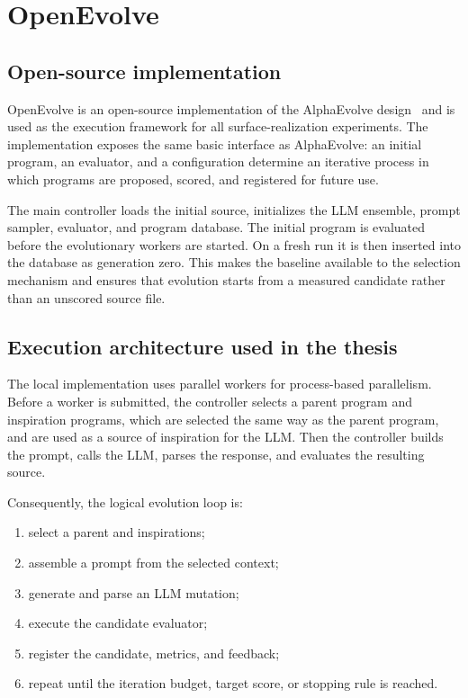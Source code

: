 \section{OpenEvolve}
\label{sec:openevolve}

\subsection{Open-source implementation}

OpenEvolve is an open-source implementation of the AlphaEvolve design~\cite{sharma2025openevolve}
and is used as the execution framework for all surface-realization experiments.
The implementation exposes the same basic interface as AlphaEvolve: an initial
program, an evaluator, and a configuration determine an iterative process in
which programs are proposed, scored, and registered for future use.

The main controller loads the
initial source, initializes the LLM ensemble, prompt sampler, evaluator, and
program database.
The initial program is evaluated before the evolutionary workers are started. On a
fresh run it is then inserted into the database as generation zero. This makes
the baseline available to the selection mechanism and ensures that evolution
starts from a measured candidate rather than an unscored source file.

\subsection{Execution architecture used in the thesis}

The local implementation uses parallel workers for
process-based parallelism. Before a worker is submitted, the controller selects
a parent program and inspiration programs, which are selected the same way as the parent
program, and are used as a source of inspiration for the LLM. Then the controller builds the prompt, calls the LLM,
parses the response, and evaluates the resulting source.

Consequently, the logical evolution loop is:

\begin{enumerate}
  \item select a parent and inspirations;
  \item assemble a prompt from the selected context;
  \item generate and parse an LLM mutation;
  \item execute the candidate evaluator;
  \item register the candidate, metrics, and feedback;
  \item repeat until the iteration budget, target score, or stopping rule is
  reached.
\end{enumerate}

